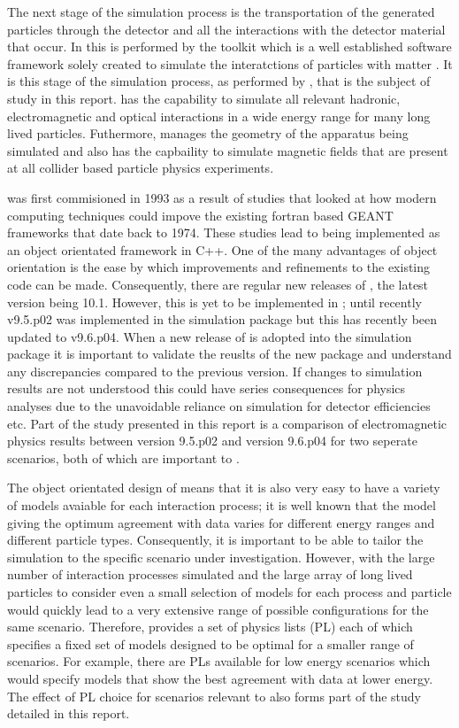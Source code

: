 The next stage of the simulation process is the transportation of the generated particles through the detector and all the interactions with the detector material that occur.  In \lhcb this is performed by the \geant toolkit which is a well established software framework solely created to simulate the interatctions of particles with matter \cite{Agostinelli:2002hh}.  It is this stage of the simulation process, as performed by \geant, that is the subject of study in this report.  \geant has the capability to simulate all relevant hadronic, electromagnetic and optical interactions in a wide energy range for many long lived particles. Futhermore, \geant manages the geometry of the apparatus being simulated and also has the capbaility to simulate magnetic fields that are present at all collider based particle physics experiments.

\geant was first commisioned in 1993 as a result of studies that looked at how modern computing techniques could impove the existing fortran based GEANT frameworks that date back to 1974\cite{Agostinelli:2002hh,Brun:118715}.  These studies lead to \geant being implemented as an object orientated framework in C++.  One of the many advantages of object orientation is the ease by which improvements and refinements to the existing code can be made.  Consequently, there are regular new releases of \geant, the latest version being 10.1\cite{g410.1rn}. However, this is yet to be implemented in \lhcb; until recently \geant v9.5.p02 was implemented in the \lhcb simulation package but this has recently been updated to v9.6.p04.  When a new release of \geant is adopted into the \lhcb simulation package it is important to validate the reuslts of the new package and understand any discrepancies compared to the previous version.  If changes to simulation results are not understood this could have series consequences for physics analyses due to the unavoidable reliance on simulation for detector efficiencies etc.  Part of the study presented in this report is a comparison of electromagnetic physics results between \geant version 9.5.p02 and version 9.6.p04 for two seperate scenarios, both of which are important to \lhcb.

The object orientated design of \geant means that it is also very easy to have a variety of models avaiable for each interaction process; it is well known that the model giving the optimum agreement with data varies for different energy ranges and different particle types.  Consequently, it is important to be able to tailor the simulation to the specific scenario under investigation.  However, with the large number of interaction processes simulated and the large array of long lived particles to consider even a small selection of models for each process and particle would quickly lead to a very extensive range of possible configurations for the same scenario.  Therefore, \geant provides a set of physics lists (PL) each of which specifies a fixed set of models designed to be optimal for a smaller range of scenarios.  For example, there are PLs available for low energy scenarios which would specify models that show the best agreement with data at lower energy.  The effect of PL choice for scenarios relevant to \lhcb also forms part of the study detailed in this report.

